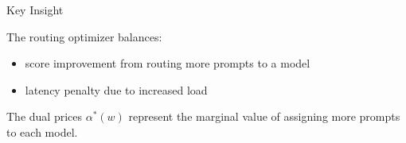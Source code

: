 \documentclass{beamer}
\begin{document}
\begin{frame}{Key Insight}

The routing optimizer balances:

\begin{itemize}
\item score improvement from routing more prompts to a model
\item latency penalty due to increased load
\end{itemize}

The dual prices $\alpha^*(w)$ represent the marginal value of assigning more prompts to each model.

\end{frame}
\end{document}
